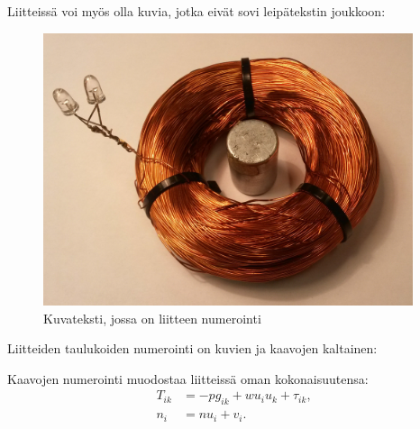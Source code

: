 \documentclass[english, 12pt, a4paper, elec, utf8, a-1b, online]{aaltothesis}
\begin{document}

Liitteiss\"a voi my\"os olla kuvia, jotka
eiv\"at sovi leip\"atekstin joukkoon:
\begin{figure}[htb]
\begin{center}
\includegraphics[height=8cm]{./ledspole.jpg}
\end{center}
\caption{Kuvateksti, jossa on liitteen numerointi}
\label{liitekuva}
\end{figure}
Liitteiden taulukoiden numerointi on kuvien ja kaavojen kaltainen:
\begin{table}[htb]
\caption{Taulukon kuvateksti.}
\label{liitetaulukko}
\begin{center}
\end{center}
\end{table}
Kaavojen numerointi muodostaa liitteiss\"a oman kokonaisuutensa:
\begin{align}
T_{ik} &= -p g_{ik} + w u_i u_k + \tau_{ik},  \label{liitekaava3} \\
n_i    &= n u_i + v_i.                      \label{liitekaava4}
\end{align}
\end{document}
